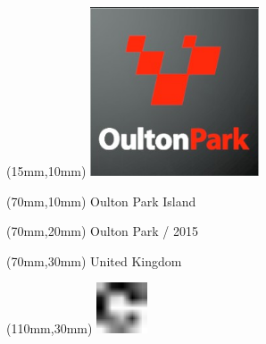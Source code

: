 \null\newpage
\begin{textblock*}{50mm}(15mm,10mm)%
\includegraphics[width=50mm]{LG/2015-05-20_00091.png}
\end{textblock*}
\begin{textblock*}{130mm}(70mm,10mm)%
{\fontsize{20}{20}\selectfont Oulton Park Island}\\
\end{textblock*}
\begin{textblock*}{120mm}(70mm,20mm)%
{\fontsize{16}{16}\selectfont Oulton Park / 2015}\\
\end{textblock*}
\begin{textblock*}{120mm}(70mm,30mm)%
{\fontsize{12}{12}\selectfont United Kingdom}
\end{textblock*}
\begin{textblock*}{30mm}(110mm,30mm)%
\centering
\includegraphics[height=15mm]{icons/fa-rotate-right.pdf}
\end{textblock*}
